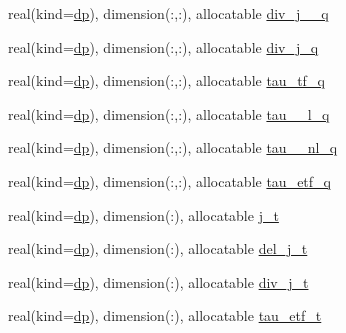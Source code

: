 \begin{DoxyCompactItemize}
real(kind=\mbox{\hyperlink{namespaceparameters_a52f8c6351fd79345d8811e065bcbbb37}{dp}}), dimension(\+:,\+:), allocatable \mbox{\hyperlink{group__OTHER__DENSITIES_ga42f7b6eda54c2f6b7dbfbc5a0d3a1bf4}{div\+\_\+j\+\_\+\_\+q}}
\item 
real(kind=\mbox{\hyperlink{namespaceparameters_a52f8c6351fd79345d8811e065bcbbb37}{dp}}), dimension(\+:,\+:), allocatable \mbox{\hyperlink{group__OTHER__DENSITIES_ga8181dfebaf3cbf23118c8322b1eed86d}{div\+\_\+j\+\_\+q}}
\item 
real(kind=\mbox{\hyperlink{namespaceparameters_a52f8c6351fd79345d8811e065bcbbb37}{dp}}), dimension(\+:,\+:), allocatable \mbox{\hyperlink{group__OTHER__DENSITIES_gab6c3712299b2394aa1cdc011d9373ab8}{tau\+\_\+tf\+\_\+q}}
\item 
real(kind=\mbox{\hyperlink{namespaceparameters_a52f8c6351fd79345d8811e065bcbbb37}{dp}}), dimension(\+:,\+:), allocatable \mbox{\hyperlink{group__OTHER__DENSITIES_ga045973682837700d382d75a8f6de7d9c}{tau\+\_\+\_\+l\+\_\+q}}
\item 
real(kind=\mbox{\hyperlink{namespaceparameters_a52f8c6351fd79345d8811e065bcbbb37}{dp}}), dimension(\+:,\+:), allocatable \mbox{\hyperlink{group__OTHER__DENSITIES_ga64b5af532da52ba869f0fba447812146}{tau\+\_\+\_\+nl\+\_\+q}}
\item 
real(kind=\mbox{\hyperlink{namespaceparameters_a52f8c6351fd79345d8811e065bcbbb37}{dp}}), dimension(\+:,\+:), allocatable \mbox{\hyperlink{group__OTHER__DENSITIES_ga8fa22b66605b27eaece8dbd54577ebc8}{tau\+\_\+etf\+\_\+q}}
\item 
real(kind=\mbox{\hyperlink{namespaceparameters_a52f8c6351fd79345d8811e065bcbbb37}{dp}}), dimension(\+:), allocatable \mbox{\hyperlink{group__OTHER__DENSITIES_ga403b0aed00d1b8df4af16d47bc09977f}{j\+\_\+t}}
\item 
real(kind=\mbox{\hyperlink{namespaceparameters_a52f8c6351fd79345d8811e065bcbbb37}{dp}}), dimension(\+:), allocatable \mbox{\hyperlink{group__OTHER__DENSITIES_ga1c75e349365b3d0cd01f2f1ed6fc3a06}{del\+\_\+j\+\_\+t}}
\item 
real(kind=\mbox{\hyperlink{namespaceparameters_a52f8c6351fd79345d8811e065bcbbb37}{dp}}), dimension(\+:), allocatable \mbox{\hyperlink{group__OTHER__DENSITIES_gaae73460a531438ad3711b017dc727066}{div\+\_\+j\+\_\+t}}
\item 
real(kind=\mbox{\hyperlink{namespaceparameters_a52f8c6351fd79345d8811e065bcbbb37}{dp}}), dimension(\+:), allocatable \mbox{\hyperlink{group__OTHER__DENSITIES_ga38f8f27b19a3324faae16c6831f551db}{tau\+\_\+etf\+\_\+t}}

\end{DoxyCompactItemize}
